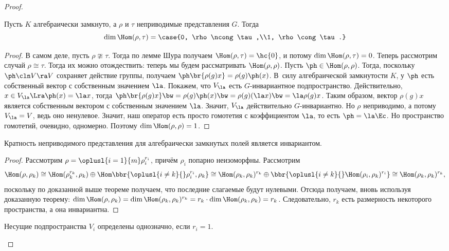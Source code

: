 \documentclass[a4paper]{article}
\begin{document}
\begin{proof}
\begin{theorem}
Пусть $K$ алгебраически замкнуто, а $\rho$ и $\tau$ неприводимые представления $G$.
Тогда
$$\dim \Hom(\rho,\tau)=\case{0, \rho \ncong \tau,\\1, \rho \cong \tau.}$$
\end{theorem}
\begin{proof}
В самом деле, пусть $\rho \ncong \tau$. Тогда по лемме
Шура получаем $\Hom(\rho,\tau)=\hc{0}$, и потому $\dim
\Hom(\rho,\tau) = 0$. Теперь рассмотрим случай $\rho \cong \tau$.
Тогда их можно отождествить: теперь мы будем рассматривать
$\Hom(\rho,\rho)$. Пусть $\ph \in \Hom(\rho,\rho)$. Тогда,
поскольку $\ph\cln V \ra V$ сохраняет действие группы, получаем
$\ph\br{\rho(g)x}=\rho(g)\ph(x)$. В~силу алгебраической
замкнутости $K$, у $\ph$ есть собственный вектор с собственным
значением $\la$. Покажем, что $V_\la$ есть $G$-инвариантное
подпространство. Действительно, $x \in V_\la \Lra \ph(x)=\la x$,
тогда $\ph\br{\rho(g)x} \bw= \rho(g)\ph(x) \bw= \rho(g)(\la x) \bw= \la
\rho(g)x$. Таким образом, вектор $\rho(g)x$ является собственным
вектором с собственным значением $\la$. Значит, $V_\la$
действительно $G$-инвариантно. Но $\rho$ неприводимо, а потому
$V_\la = V$, ведь оно ненулевое. Значит, наш оператор есть просто
гомотетия с коэффициентом $\la$, то есть $\ph = \la \Ec$. Но пространство
гомотетий, очевидно, одномерно. Поэтому $\dim \Hom(\rho,\rho) =1$.
\end{proof}

\begin{imp}
Кратность неприводимого представления для алгебраически замкнутых полей является инвариантом.
\end{imp}
\begin{proof}
Рассмотрим $\rho = \oplusl{i=1}{m}\rho_i^{r_i}$, причём $\rho_i$ попарно неизоморфны.
Рассмотрим
$$
  \Hom(\rho,\rho_k)\cong\Hom(\rho_k^{r_k},\rho_k)\oplus
  \Hom\bbr{\oplusl{i\neq k}{}\rho_i^{r_i}, \rho_k}\cong
  \Hom(\rho_k,\rho_k)^{r_k}\oplus\bbr{\oplusl{i\neq k}{}\Hom(\rho_i,\rho_k)^{r_i}}\cong
  \Hom(\rho_k,\rho_k)^{r_k},
$$
поскольку по доказанной выше теореме получаем, что последние слагаемые будут
нулевыми. Отсюда получаем, вновь используя доказанную теорему: $\dim \Hom(\rho,\rho_k) = \dim
\Hom(\rho_k,\rho_k)^{r_k}= r_k \cdot \dim \Hom(\rho_k,\rho_k)= r_k$. Следовательно, $r_k$ есть размерность
некоторого пространства, а она инвариантна.
\end{proof}

\begin{note}
Несущие подпространства $V_i$ определены однозначно, если $r_i = 1$.
\end{note}


\end{proof}
\end{document}
